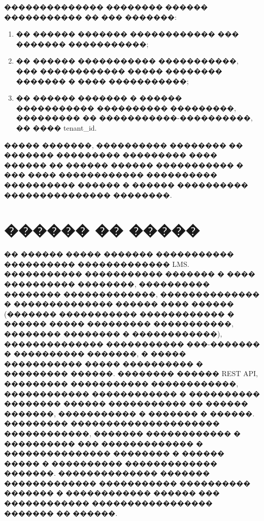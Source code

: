 �������������� �������� ������ ����������� �� ��� �������\cite{yojji_multitenant_lms_2025,owasp_top10_2021}:
\begin{enumerate}
  \item �� ������ ������� ������������ ��� ������� �����������;
  \item �� ������ ����������� �����������, ��� ������������ ����� �������� ������� � ���� �����������;
  \item �� ������ ������� � ������ ����������� ���������� ���������, ��������� �� �����������-����������, �� ���� tenant\_id.
\end{enumerate}

����� �������, ���������� �������� �� ������� ��������� ��������� ���� ������ �� ������ ������ ����������� � ��� ���� ������������ ���������� ���������� ������ � ������ ���������� ��������������� ��������.

\section{������ �� �����}

�� ������ ����� ������� ����������� ���������� ������������� LMS. ����������� ����������� ������� � ���� ���������� ��������, ���������� �������� �������������, �������������� � �������������� ������ ���� ������ (������� ����������� ������������ � ������ ����� ��������� �����������, �������� �������� � ������������), �������������� ����������� ���-������� � ���������� �������, � ����� ����������� ����� ���������� � ��������� ������. �������� ������ REST API, ��������� ����������� ������������, ������������ ������������ � ���������� �������� ������ ����������� �� ������ �������, ����������� � ������� � ������. ��������� ��������������������� ������������, ������� ������������ � ���������� ��� ������������� � ��������������� �������� � ������ ����� � ���������� ������������� �������. �������������� ������� ������������� ����������� ���������� ������� � ������������ ������ ��� ������������ ����������������� ������� �� ������\cite{grekul_proj_is,fowler_patterns_ru,booch2006uml}.
